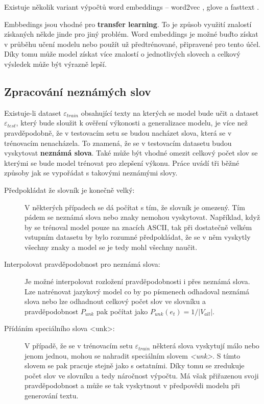 Existuje několik variant výpočtů word embeddings -- word2vec \cite{word2vec}, glove \cite{glove} a fasttext \cite{fasttext}.


Embbedings jsou vhodné pro \textbf{transfer learning}. To je způsob využití znalostí získaných někde jinde pro jiný problém. Word embeddings je možné buďto získat v průběhu učení modelu nebo použít už předtrénované, připravené pro tento účel. Díky tomu může model získat více znalostí o jednotlivých slovech a celkový výsledek může být výrazně lepší.

\subsection{Zpracování neznámých slov} \label{subsection:oov}
Existuje-li dataset $\varepsilon_{train}$ obsahující texty na kterých se model bude učit a dataset $\varepsilon_{test}$, který bude sloužit k ověření výkonosti a generalizace modelu, je více než pravděpodobně, že v testovacím setu se budou nacházet slova, která se v trénovacím nenacházela. To znamená, že se v testovacím datasetu budou vyskytovat \textbf{neznámá slova}. Také může být vhodné omezit celkový počet slov se kterými se bude model trénovat pro zlepšení výkonu. Práce \cite{nmtTutorial} uvádí tři běžné způsoby jak se vypořádat s takovými neznámými slovy.

\begin{description}
  \item[Předpokládat že slovník je konečně velký:] V některých případech se dá počítat s tím, že slovník je omezený. Tím pádem se neznámá slova nebo znaky nemohou vyskytovat. Například, když by se trénoval model pouze na znacích ASCII, tak při dostatečně velkém vstupním datasetu by bylo rozumné předpokládat, že se v něm vyskytly všechny znaky a model se je tedy mohl všechny naučit.
  \item[Interpolovat pravděpodobnost pro neznámá slova:] Je možné interpolovat rozložení pravděpodobnosti i přes neznámá slova. Lze natrénovat jazykový model co by po písmenech odhadoval neznámá slova nebo lze odhadnout celkový počet slov ve slovníku a pravděpodobnost $P_{unk}$ pak počítat jako $P_{unk}(e_t) = 1/|V_{all}|$.
  \item[Přídáním speciálního slova <unk>:]\label{description:unk}V případě, že se v trénovacím setu $\varepsilon_{train}$ některá slova vyskytují málo nebo jenom jednou, mohou se nahradit speciálním slovem \emph{<unk>}. S tímto slovem se pak pracuje stejně jako s ostatními. Díky tomu se zredukuje počet slov ve slovníku a tedy náročnost výpočtu. Má však přiřazenou svoji pravděpodobnost a může se tak vyskytnout v předpovědi modelu při generování textu.
\end{description}

